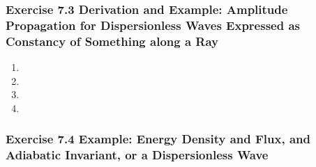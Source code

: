 \documentclass[10pt,a4paper]{article}
\theoremstyle{definition}
\begin{document}
\subsubsection{Exercise 7.3 Derivation and Example: Amplitude Propagation for Dispersionless Waves Expressed as Constancy of Something along a Ray}
\begin{enumerate}[label=(\alph*)]
\item
\item
\item
\item
\end{enumerate}

\subsubsection{Exercise 7.4 Example: Energy Density and Flux, and Adiabatic Invariant, or a Dispersionless Wave}
\end{document}
